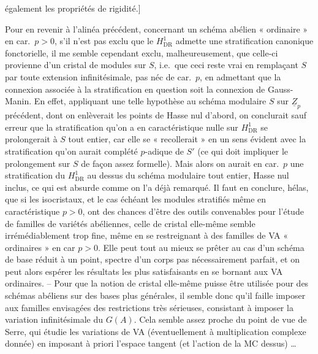 \documentclass[11pt,a4paper]{article}
\begin{document}
également les propriétés de rigidité.]

Pour en revenir à l'alinéa précédent, concernant un schéma abélien
« ordinaire » en car.\ $p>0$, s'il n'est pas exclu que le $H^1_{\mathrm{DR}}$
admette une stratification canonique fonctorielle, il me semble cependant
exclu, malheureusement, que celle-ci provienne d'un cristal \struck{\ill{}} de
modules sur $S$, i.e.\ que ceci reste vrai en remplaçant $S$ par toute
extension infinitésimale, pas néc de car.\ $p$,  en
admettant que la connexion associée à la stratification en question soit la
connexion de Gauss-Manin\supplied{)}. En effet, appliquant une telle hypothèse au
schéma modulaire $S$ sur $\underline{Z}_p$ précédent, dont on enlèverait les
points de Hasse nul d'abord, on conclurait sauf erreur que
\struck{\ill{}} la stratification qu'on a en caractéristique nulle sur
$H^1_{\mathrm{DR}}$ se prolongerait à $S$ tout entier, car elle se
« recollerait » en un sens évident avec la \struck{\ill{}} stratification qu'on
aurait \struck{\ill{}}  complété $p$-adique de $S'$ (ce qui
doit impliquer le prolongement sur $S$ de façon assez formelle). Mais alors on aurait en car.\ $p$ une
stratification du $H^1_{\mathrm{DR}}$ au dessus du schéma modulaire tout
entier, Hasse nul inclus, ce qui est absurde comme on l'a déjà remarqué. Il
faut en conclure, hélas, que si les isocristaux, et le cas échéant les modules
stratifiés même en caractéristique  $p>0$, ont des chances d'être
des outils convenables pour l'étude de familles de variétés abéliennes, celle
de cristal elle-même semble irrémédiablement trop fine, même en se restreignant
à des familles de VA « ordinaires » en car $p>0$. Elle peut tout au mieux se
prêter au cas d'un schéma de base réduit à un point, spectre d'un corps pas
nécessairement parfait, et on peut alors espérer les résultats les plus
satisfaisants en se bornant aux VA ordinaires. -- Pour que la notion de cristal
elle-même puisse être utilisée pour des schémas abéliens sur des bases plus
générales, il semble donc qu'il faille imposer aux familles envisagées des
restrictions très sérieuses, consistant à imposer la variation infinitésimale
du $G(A)$. Cela semble assez proche du point de vue de Serre, qui étudie les
variations de VA (éventuellement à multiplication complexe donnée) en imposant
à priori l'espace tangent (et l'action de la MC dessus) \ldots
\end{document}
